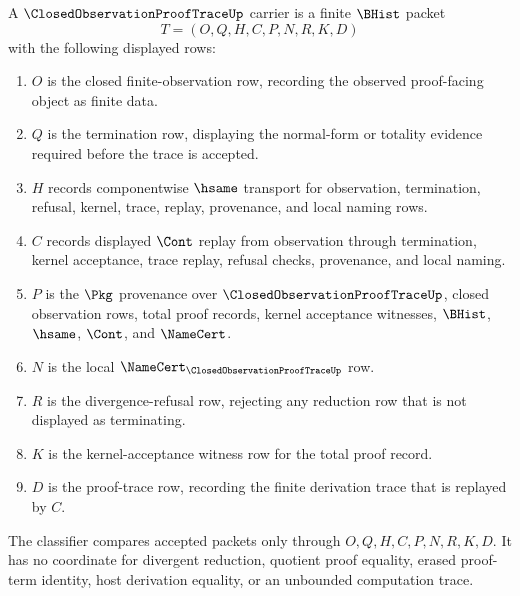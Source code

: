 \begin{definition}
\label{def:closed-observation-proof-trace-carrier}
A $\ClosedObservationProofTraceUp$ carrier is a finite $\BHist$ packet
$$
T=(O,Q,H,C,P,N,R,K,D)
$$
with the following displayed rows:
\begin{enumerate}
\item $O$ is the closed finite-observation row, recording the observed proof-facing object as finite data.
\item $Q$ is the termination row, displaying the normal-form or totality evidence required before the trace is accepted.
\item $H$ records componentwise $\hsame$ transport for observation, termination, refusal, kernel, trace, replay, provenance, and local naming rows.
\item $C$ records displayed $\Cont$ replay from observation through termination, kernel acceptance, trace replay, refusal checks, provenance, and local naming.
\item $P$ is the $\Pkg$ provenance over $\ClosedObservationProofTraceUp$, closed observation rows, total proof records, kernel acceptance witnesses, $\BHist$, $\hsame$, $\Cont$, and $\NameCert$.
\item $N$ is the local $\NameCert_{\ClosedObservationProofTraceUp}$ row.
\item $R$ is the divergence-refusal row, rejecting any reduction row that is not displayed as terminating.
\item $K$ is the kernel-acceptance witness row for the total proof record.
\item $D$ is the proof-trace row, recording the finite derivation trace that is replayed by $C$.
\end{enumerate}
The classifier compares accepted packets only through $O,Q,H,C,P,N,R,K,D$. It has no coordinate for divergent reduction, quotient proof equality, erased proof-term identity, host derivation equality, or an unbounded computation trace.
\end{definition}

